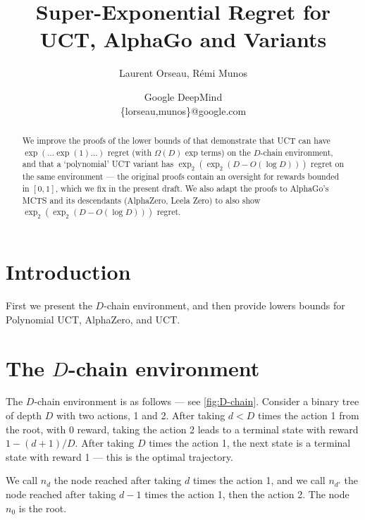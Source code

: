 \documentclass[a4paper]{article}
\title{Super-Exponential Regret for UCT, AlphaGo and Variants}
\author{Laurent Orseau, Rémi Munos}
\date{Google DeepMind \\ \{lorseau,munos\}@google.com}
\begin{document}
\maketitle

\begin{abstract}
We improve the proofs of the lower bounds of \citet{coquelin2007bandit} 
that demonstrate that UCT can have $\exp(\dots\exp(1)\dots)$ regret
(with $\Omega(D)$ exp terms)
on the $D$-chain environment, and that a `polynomial' UCT variant has $\exp_2(\exp_2(D - O(\log D)))$ regret on the same environment ---
the original proofs contain an oversight for rewards bounded in $[0, 1]$, which we fix in the present draft.
We also adapt the proofs to AlphaGo's MCTS and its descendants (\eg AlphaZero, Leela Zero) to also show 
$\exp_2(\exp_2(D - O(\log D)))$ regret.
\end{abstract}

\section{Introduction}

First we present the $D$-chain environment, and then provide lowers bounds for Polynomial UCT, AlphaZero, and UCT.

\section{The $D$-chain environment}

The $D$-chain environment \citep{coquelin2007bandit} is as follows --- see \cref{fig:D-chain}.
Consider a binary tree of depth $D$ with two actions, 1 and 2.
After taking $d<D$ times the action 1 from the root, with 0 reward,
taking the action 2 leads to a terminal state with reward $1-(d+1)/D$.
After taking $D$ times the action 1, the next state is a terminal state with reward 1 --- this is the optimal trajectory.

We call $n_d$ the node reached after taking $d$ times the action 1,
and we call $n_{d'}$ the node reached after taking $d-1$ times the action 1, then the action 2. The node $n_0$ is the root.
\end{document}
